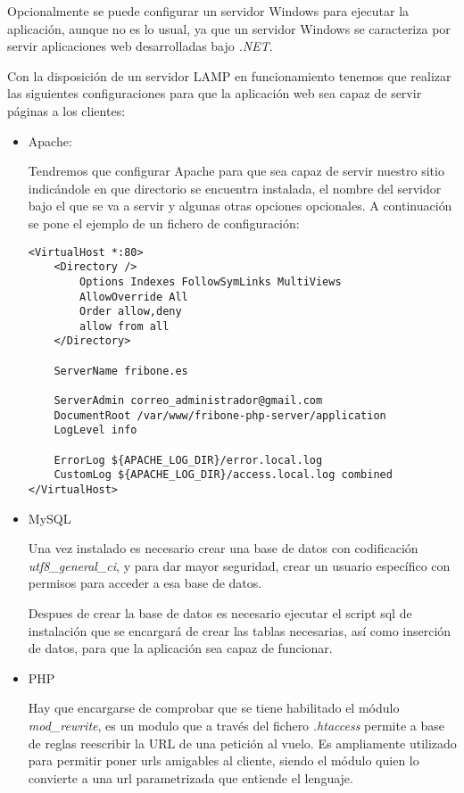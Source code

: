 Opcionalmente se puede configurar un servidor Windows para ejecutar la aplicación, aunque no es lo usual, ya que un servidor Windows se caracteriza por servir aplicaciones web desarrolladas bajo \emph{.NET}.

Con la disposición de un servidor LAMP en funcionamiento tenemos que realizar las siguientes configuraciones para que la aplicación web sea capaz de servir páginas a los clientes:

	\begin{itemize}
		\item Apache:

			Tendremos que configurar Apache para que sea capaz de servir nuestro sitio indicándole en que directorio se encuentra instalada, el nombre del servidor bajo el que se va a servir y algunas otras opciones opcionales. A continuación se pone el ejemplo de un fichero de configuración:

				\begin{lstlisting}
<VirtualHost *:80>
    <Directory />
        Options Indexes FollowSymLinks MultiViews
        AllowOverride All
        Order allow,deny
        allow from all
    </Directory>

	ServerName fribone.es

	ServerAdmin correo_administrador@gmail.com
	DocumentRoot /var/www/fribone-php-server/application
	LogLevel info

	ErrorLog ${APACHE_LOG_DIR}/error.local.log
	CustomLog ${APACHE_LOG_DIR}/access.local.log combined
</VirtualHost>
				\end{lstlisting} 

		\item MySQL

			Una vez instalado es necesario crear una base de datos con codificación \emph{utf8\_general\_ci}, y para dar mayor seguridad, crear un usuario específico con permisos para acceder a esa base de datos.

			Despues de crear la base de datos es necesario ejecutar el script sql de instalación que se encargará de crear las tablas necesarias, así como inserción de datos, para que la aplicación sea capaz de funcionar.

		\item PHP

			Hay que encargarse de comprobar que se tiene habilitado el módulo \emph{mod\_rewrite}, es un modulo que a través del fichero \emph{.htaccess} permite a base de reglas reescribir la URL de una petición al vuelo. Es ampliamente utilizado para permitir poner urls amigables al cliente, siendo el módulo quien lo convierte a una url parametrizada que entiende el lenguaje.


\end{itemize}
